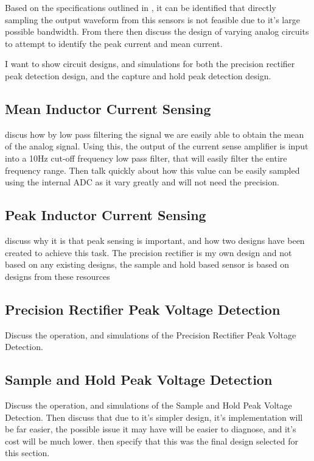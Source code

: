 Based on the specifications outlined in , it can be identified that directly sampling the output waveform from this sensors is not feasible due to it's large possible bandwidth. From there then discuss the design of varying analog circuits to attempt to identify the peak current and mean current. 

I want to show circuit designs, and simulations for both the precision rectifier peak detection design, and the capture and hold peak detection design. 


\subsection{Mean Inductor Current Sensing}

discus how by low pass filtering the signal we are easily able to obtain the mean of the analog signal. Using this, the output of the current sense amplifier is input into a 10Hz cut-off frequency low pass filter, that will easily filter the entire frequency range. Then talk quickly about how this value can be easily sampled using the internal ADC as it vary greatly and will not need the precision. 


\subsection{Peak Inductor Current Sensing}

discuss why it is that peak sensing is important, and how two designs have been created to achieve this task. The precision rectifier is my own design and not based on any existing designs, the sample and hold based sensor is based on designs from these resources \cite{peak_detector_designs, LTC6244_peak_detector}

\subsection*{Precision Rectifier Peak Voltage Detection}\label{S:current_sense_precision_rectifier_design}

Discuss the operation, and simulations of the Precision Rectifier Peak Voltage Detection. 

\subsection*{Sample and Hold Peak Voltage Detection}\label{S:current_sense_sample_and_hold_design}

Discuss the operation, and simulations of the Sample and Hold Peak Voltage Detection. Then discuss that due to it's simpler design, it's implementation will be far easier, the possible issue it may have will be easier to diagnose, and it's cost will be much lower. then specify that this was the final design selected for this section.

